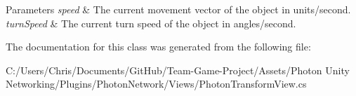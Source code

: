 \begin{DoxyParams}{Parameters}
{\em speed} & The current movement vector of the object in units/second.\\
\hline
{\em turn\+Speed} & The current turn speed of the object in angles/second.\\
\hline
\end{DoxyParams}


The documentation for this class was generated from the following file\+:\begin{DoxyCompactItemize}
\item 
C\+:/\+Users/\+Chris/\+Documents/\+Git\+Hub/\+Team-\/\+Game-\/\+Project/\+Assets/\+Photon Unity Networking/\+Plugins/\+Photon\+Network/\+Views/Photon\+Transform\+View.\+cs\end{DoxyCompactItemize}
